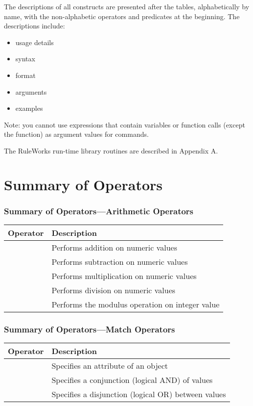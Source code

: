 The descriptions of all constructs are presented after the tables,
alphabetically by name, with the non-alphabetic operators and
predicates at the beginning. The descriptions include:

\begin{itemize}
\item usage details
\item syntax
\item format
\item arguments
\item examples
\end{itemize}

Note: you cannot use expressions that contain variables or function
calls (except the  function) as argument values for
commands.

The RuleWorks run-time library routines are described in Appendix A.

\section{Summary of Operators}

\subsubsection{Summary of Operators---Arithmetic Operators}

\begin{tabularx}{\columnwidth}{cX}
  \toprule
  Operator & Description \\
  \midrule
  \co{+} & Performs addition on numeric values \\
  \co{-} & Performs subtraction on numeric values \\
  \co{*} & Performs multiplication on numeric values \\
  \co{/} & Performs division on numeric values \\
  \co{\textbackslash} & Performs the modulus operation on integer value \\
  \bottomrule
\end{tabularx}

\subsubsection{Summary of Operators---Match Operators}

\begin{tabularx}{\columnwidth}{cX}
  \toprule
  Operator & Description \\
  \midrule
  \ct & Specifies an attribute of an object \\
  \co{\{} \co{\}} & Specifies a conjunction (logical AND) of values \\
  \co{<<} \co{>>} & Specifies a disjunction (logical OR)
                    between values \\
  \bottomrule
\end{tabularx}
  
